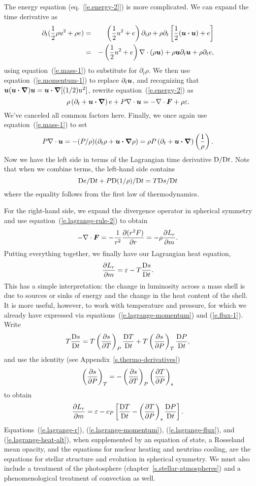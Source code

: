 The energy equation (eq.~[\ref{e.energy-2}]) is more complicated. We can expand the time derivative as
\begin{eqnarray*}
	\partial_{t}(\frac{1}{2}\rho u^{2} + \rho e) 
	&=& \left(\frac{1}{2}u^{2} + e\right)\partial_{t}\rho + \rho\partial_{t}\left[\frac{1}{2}(\boldsymbol{u}\boldsymbol{\cdot}\boldsymbol{u}) + e\right]\\
	&=& -\left(\frac{1}{2}u^{2} + e\right)\nabla \cdot\left(\rho\boldsymbol{u}\right) + \rho \boldsymbol{u}\partial_{t}\boldsymbol{u} + \rho\partial_{t}e,
\end{eqnarray*}
using equation~(\ref{e.mass-1}) to substitute for $\partial_{t}\rho$.  We then use equation~(\ref{e.momentum-1}) to replace $\partial_{t}\boldsymbol{u}$, and recognizing that $\boldsymbol{u}(\boldsymbol{u}\boldsymbol{\cdot}\boldsymbol{\nabla})\boldsymbol{u} = \boldsymbol{u}\boldsymbol{\cdot}\boldsymbol{\nabla}[(1/2)u^{2}]$, rewrite equation~(\ref{e.energy-2}) as
\[ 
	\rho\left(\partial_{t} + \boldsymbol{u}\boldsymbol{\cdot}\boldsymbol{\nabla}\right) e + P\nabla \cdot\boldsymbol{u} = -\nabla \cdot\boldsymbol{F} + \rho\varepsilon.
\]
We've canceled all common factors here.  Finally, we once again use equation~(\ref{e.mass-1}) to set 
\[
	P\nabla \cdot\boldsymbol{u} = -(P/\rho)(\partial_{t}\rho + \boldsymbol{u}\boldsymbol{\cdot}\boldsymbol{\nabla} \rho) 
	= \rho P\left(\partial_{t} + \boldsymbol{u}\boldsymbol{\cdot}\boldsymbol{\nabla}\right)\left(\frac{1}{\rho}\right).
\]
Now we have the left side in terms of the Lagrangian time derivative $\mathrm{D}/\mathrm{D} t$.  Note that when we combine terms, the left-hand side contains 
\[ \mathrm{D} e/\mathrm{D} t + P\mathrm{D} (1/\rho)/\mathrm{D} t = T\mathrm{D} s/\mathrm{D} t \] 
where the equality follows from the first law of thermodynamics.

For the right-hand side, we expand the divergence operator in spherical symmetry and use equation~(\ref{e.lagrange-rule-2}) to obtain
\[
	-\nabla \cdot\boldsymbol{F} = -\frac{1}{r^{2}}\frac{\partial(r^{2} F)}{\partial r} = -\rho\frac{\partial L_{r}}{\partial m}.
\]
Putting everything together, we finally have our Lagrangian heat equation,
\begin{equation}\label{e.lagrange-heat}
	\frac{\partial L_{r}}{\partial m} = \varepsilon - T\frac{\mathrm{D} s}{\mathrm{D} t}.
\end{equation}
This has a simple interpretation: the change in luminosity across a mass shell is due to sources or sinks of energy and the change in the heat content of the shell.  It is more useful, however, to work with temperature and pressure, for which we already have expressed via equations~(\ref{e.lagrange-momentum}) and (\ref{e.flux-1}).  Write
\[
	T\frac{\mathrm{D} s}{\mathrm{D} t} = T\left(\frac{\partial s}{\partial T}\right)_{P}\frac{\mathrm{D} T}{\mathrm{D} t} + T\left(\frac{\partial s}{\partial P}\right)_{T}\frac{\mathrm{D} P}{\mathrm{D} t},
\]
and use the identity (see Appendix~\ref{s.thermo-derivatives})
\[
	\left(\frac{\partial s}{\partial P}\right)_{T} = -\left(\frac{\partial s}{\partial T}\right)_{P}\left(\frac{\partial T}{\partial P}\right)_{s}
\]
to obtain
\begin{equation}\label{e.lagrange-heat-alt}
	\frac{\partial L_{r}}{\partial m} 
	= \varepsilon - c_{P}\left[ \frac{\mathrm{D} T}{\mathrm{D} t} - \left(\frac{\partial T}{\partial P}\right)_{s} \frac{\mathrm{D} P}{\mathrm{D} t}\right].
\end{equation}
Equations~(\ref{e.lagrange-r}), (\ref{e.lagrange-momentum}), (\ref{e.lagrange-flux}), and (\ref{e.lagrange-heat-alt}), when supplemented by an equation of state, a Rosseland mean opacity, and the equations for nuclear heating and neutrino cooling, are the equations for stellar structure and evolution in spherical symmetry. We must also include a treatment of the photosphere (chapter~\ref{s.stellar-atmospheres}) and a phenomenological treatment of convection as well.
